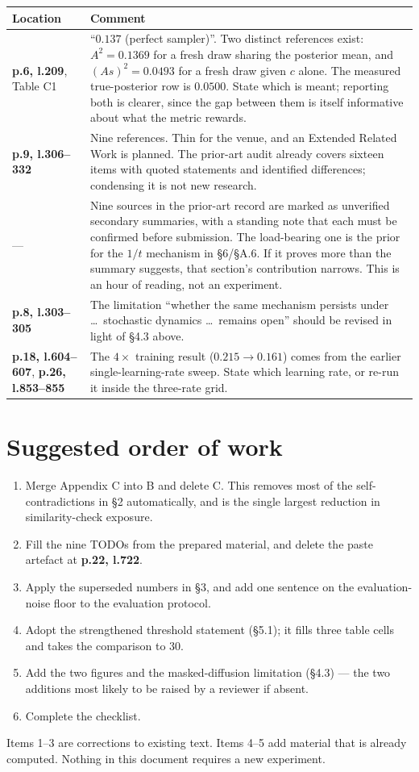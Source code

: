 \documentclass[11pt]{article}
\newcommand{\pl}[2]{\textbf{p.#1, l.#2}}
\begin{document}
\begin{longtable}{@{}p{}p{}@{}}
\toprule
Location & Comment\\
\midrule
\endhead
\pl{6}{209}, Table C1 & ``$0.137$ (perfect sampler)''. Two distinct references exist:
$A^2=0.1369$ for a fresh draw sharing the posterior mean, and $(As)^2=0.0493$ for a fresh draw
given $c$ alone. The measured true-posterior row is $0.0500$. State which is meant; reporting
both is clearer, since the gap between them is itself informative about what the metric rewards.\\
\addlinespace
\pl{9}{306--332} & Nine references. Thin for the venue, and an Extended Related Work is planned.
The prior-art audit already covers sixteen items with quoted statements and identified
differences; condensing it is not new research.\\
\addlinespace
--- & Nine sources in the prior-art record are marked as unverified secondary summaries, with a
standing note that each must be confirmed before submission. The load-bearing one is the prior
for the $1/t$ mechanism in \S6/\S A.6. If it proves more than the summary suggests, that
section's contribution narrows. This is an hour of reading, not an experiment.\\
\addlinespace
\pl{8}{303--305} & The limitation ``whether the same mechanism persists under \dots\ stochastic
dynamics \dots\ remains open'' should be revised in light of \S4.3 above.\\
\addlinespace
\pl{18}{604--607}, \pl{26}{853--855} & The $4\times$ training result ($0.215\to0.161$) comes from
the earlier single-learning-rate sweep. State which learning rate, or re-run it inside the
three-rate grid.\\
\bottomrule
\end{longtable}

\section{Suggested order of work}

\begin{enumerate}
\item Merge Appendix C into B and delete C. This removes most of the self-contradictions in
\S2 automatically, and is the single largest reduction in similarity-check exposure.
\item Fill the nine TODOs from the prepared material, and delete the paste artefact at
\pl{22}{722}.
\item Apply the superseded numbers in \S3, and add one sentence on the evaluation-noise floor to
the evaluation protocol.
\item Adopt the strengthened threshold statement (\S5.1); it fills three table cells and takes
the comparison to $30$.
\item Add the two figures and the masked-diffusion limitation (\S4.3) --- the two additions most
likely to be raised by a reviewer if absent.
\item Complete the checklist.
\end{enumerate}

Items 1--3 are corrections to existing text. Items 4--5 add material that is already computed.
Nothing in this document requires a new experiment.
\end{document}
